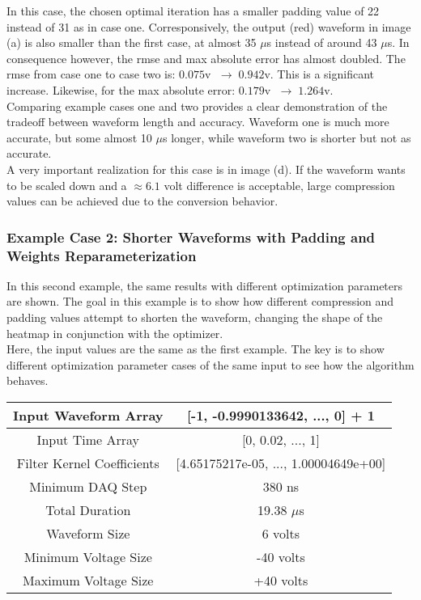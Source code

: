 \documentclass[11pt, a4paper]{article}
\theoremstyle{definition}
\numberwithin{equation}{section}
\begin{document}
In this case, the chosen optimal iteration has a smaller padding value of 22 instead of 31 as in case one. Corresponsively, the output (red) waveform in image (a) is also smaller than the first case, at almost 35 $\mu$s instead of around 43 $\mu$s. In consequence however, the rmse and max absolute error has almost doubled. The rmse from case one to case two is: $0.075$v $\; \rightarrow \; 0.942$v. This is a significant increase. Likewise, for the max absolute error: $0.179$v $\; \rightarrow \; 1.264$v.
\\
Comparing example cases one and two provides a clear demonstration of the tradeoff between waveform length and accuracy. Waveform one is much more accurate, but some almost 10 $\mu$s longer, while waveform two is shorter but not as accurate.
\\
A very important realization for this case is in image (d). If the waveform wants to be scaled down and a $\approx 6.1$ volt difference is acceptable, large compression values can be achieved due to the conversion behavior.

\subsubsection{Example Case 2: Shorter Waveforms with Padding and Weights Reparameterization}

In this second example, the same results with different optimization parameters are shown. The goal in this example is to show how different compression and padding values attempt to shorten the waveform, changing the shape of the heatmap in conjunction with the optimizer.
\\
Here, the input values are the same as the first example. The key is to show different optimization parameter cases of the same input to see how the algorithm behaves.

\begin{center}
\begin{tabular}{ | c | c | } 
  \hline
   Input Waveform Array & [-1, -0.9990133642, ..., 0] + 1 \\ 
  \hline
  Input Time Array & [0, 0.02, ..., 1] \\ 
  \hline
  Filter Kernel Coefficients & [4.65175217e-05, ..., 1.00004649e+00] \\ 
  \hline
  Minimum DAQ Step & 380 ns \\ 
  \hline
  Total Duration & 19.38 $\mu$s \\ 
  \hline
  Waveform Size & 6 volts \\ 
  \hline
  Minimum Voltage Size & -40 volts \\ 
  \hline
  Maximum Voltage Size & +40 volts \\ 
  \hline
\end{tabular}
\end{center}
\end{document}
